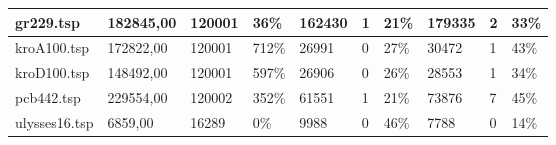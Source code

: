 \begin{table}[H]
\begin{tabular}{|l|l|l|l|l|l|l|l|l|l|}
\rowcolor[HTML]{EFEFEF} 
{\color[HTML]{000000} gr229.tsp}                                                                        & {\color[HTML]{000000} 182845,00}                 & {\color[HTML]{000000} 120001}             & {\color[HTML]{000000} 36\%}                 & {\color[HTML]{000000} 162430}                    & {\color[HTML]{000000} 1}                  & {\color[HTML]{000000} 21\%}                 & {\color[HTML]{000000} 179335}                    & {\color[HTML]{000000} 2}                  & {\color[HTML]{000000} 33\%}                 \\ \hline
{\color[HTML]{000000} kroA100.tsp}                                                                      & {\color[HTML]{000000} 172822,00}                 & {\color[HTML]{000000} 120001}             & {\color[HTML]{000000} 712\%}                & {\color[HTML]{000000} 26991}                     & {\color[HTML]{000000} 0}                  & {\color[HTML]{000000} 27\%}                 & {\color[HTML]{000000} 30472}                     & {\color[HTML]{000000} 1}                  & {\color[HTML]{000000} 43\%}                 \\ \hline
\rowcolor[HTML]{EFEFEF} 
{\color[HTML]{000000} kroD100.tsp}                                                                      & {\color[HTML]{000000} 148492,00}                 & {\color[HTML]{000000} 120001}             & {\color[HTML]{000000} 597\%}                & {\color[HTML]{000000} 26906}                     & {\color[HTML]{000000} 0}                  & {\color[HTML]{000000} 26\%}                 & {\color[HTML]{000000} 28553}                     & {\color[HTML]{000000} 1}                  & {\color[HTML]{000000} 34\%}                 \\ \hline
{\color[HTML]{000000} pcb442.tsp}                                                                       & {\color[HTML]{000000} 229554,00}                 & {\color[HTML]{000000} 120002}             & {\color[HTML]{000000} 352\%}                & {\color[HTML]{000000} 61551}                     & {\color[HTML]{000000} 1}                  & {\color[HTML]{000000} 21\%}                 & {\color[HTML]{000000} 73876}                     & {\color[HTML]{000000} 7}                  & {\color[HTML]{000000} 45\%}                 \\ \hline
\rowcolor[HTML]{EFEFEF} 
{\color[HTML]{000000} ulysses16.tsp}                                                                    & {\color[HTML]{000000} 6859,00}                   & {\color[HTML]{000000} 16289}              & {\color[HTML]{000000} 0\%}                  & {\color[HTML]{000000} 9988}                      & {\color[HTML]{000000} 0}                  & {\color[HTML]{000000} 46\%}                 & {\color[HTML]{000000} 7788}                      & {\color[HTML]{000000} 0}                  & {\color[HTML]{000000} 14\%}                 \\ \hline

\end{tabular}
\end{table}
